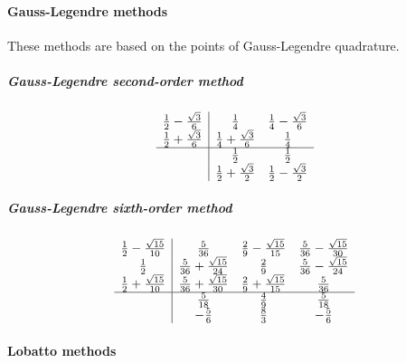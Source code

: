 \paragraph{Gauss-Legendre methods}
These methods are based on the points of Gauss-Legendre quadrature.

\subparagraph{Gauss-Legendre second-order method}
\begin{equation}
	\begin{array}{c|cc}
		\frac{1}{2}-\frac{\sqrt3}{6} &         \frac{1}{4}          & \frac{1}{4}-\frac{\sqrt3}{6} \\
		\frac{1}{2}+\frac{\sqrt3}{6} & \frac{1}{4}+\frac{\sqrt3}{6} &         \frac{1}{4}          \\ \hline
		                             &         \frac{1}{2}          &         \frac{1}{2}          \\
		                             &   \frac12+\frac{\sqrt3}{2}   &   \frac12-\frac{\sqrt3}{2}
	\end{array}
	\label{eq::gauss-legendre_2}
\end{equation}

\subparagraph{Gauss-Legendre sixth-order method}
\begin{equation}
	\begin{array}{c|ccc}
		\frac{1}{2} - \frac{\sqrt{15}}{10} &            \frac{5}{36}             & \frac{2}{9}- \frac{\sqrt{15}}{15}  & \frac{5}{36} - \frac{\sqrt{15}}{30} \\
		           \frac{1}{2}             & \frac{5}{36} + \frac{\sqrt{15}}{24} &            \frac{2}{9}             & \frac{5}{36} - \frac{\sqrt{15}}{24} \\
		\frac{1}{2} + \frac{\sqrt{15}}{10} & \frac{5}{36} + \frac{\sqrt{15}}{30} & \frac{2}{9} + \frac{\sqrt{15}}{15} &            \frac{5}{36}             \\ \hline
		                                   &            \frac{5}{18}             &            \frac{4}{9}             &            \frac{5}{18}             \\
		                                   &              -\frac56               &              \frac83               &              -\frac56
	\end{array}
	\label{eq::gauss-legendre_6}
\end{equation}

\paragraph{Lobatto methods}

